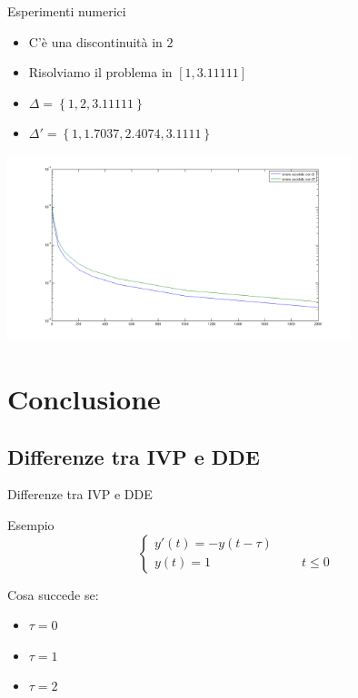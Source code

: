 \documentclass[intlimits]{beamer}
\numberwithin{equation}{section}
\theoremstyle{plain}
\theoremstyle{definition}
\theoremstyle{remark}
\begin{document}
\begin{frame}{Esperimenti numerici}

\begin{block}{}
\begin{itemize}[<+->]
 \item C'è una discontinuità in $2$
 \item Risolviamo il problema in $[1,3.11111]$
 \item $\Delta=\left \{1, 2, 3.11111 \right \}$
 \item $\Delta' = \left \{ 1, 1.7037, 2.4074, 3.1111 \right \}$
\end{itemize}
\end{block}

\includegraphics[width=10cm]{immagini/immagine11.png}


\end{frame}



\section{Conclusione}

\subsection{Differenze tra IVP e DDE}


\begin{frame}{Differenze tra IVP e DDE}

\pause
\begin{block}{Esempio}
 $$
  \begin{cases}
  y'(t)=-y(t-\tau)	\\
  y(t)=1		\hspace{3cm}	t \le 0
  \end{cases}
$$
\end{block}

\pause

\vspace{2cm}

\begin{block}{Cosa succede se:}
\begin{itemize}[<+->]
 \item $\tau=0$
 \item $\tau=1$
 \item $\tau=2$
\end{itemize}
\end{block}



\end{frame}
\end{document}
